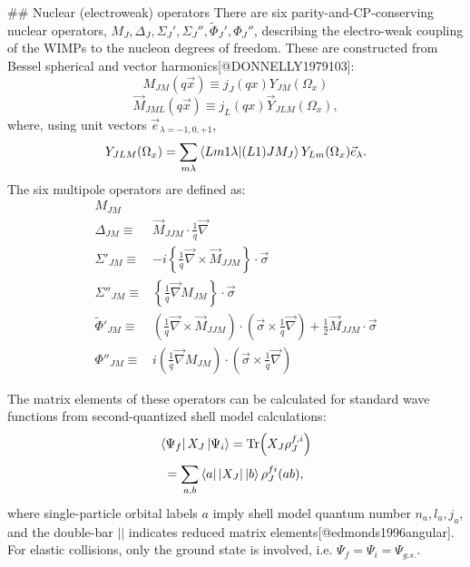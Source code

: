 ## Nuclear (electroweak) operators
There are six parity-and-CP-conserving nuclear operators, $M_J, \Delta_J,
\Sigma_J', \Sigma_J'', \tilde{\Phi}_J', \Phi_J''$, describing the electro-weak
coupling of the WIMPs to the nucleon degrees of freedom.  These are constructed
from Bessel spherical and vector harmonics[@DONNELLY1979103]:
\begin{equation}
    M_{JM}(q\vec{x})\equiv j_J(qx)Y_{JM}(\Omega_x)
\end{equation}
\begin{equation}
    \vec{M}_{JML}(q\vec{x}) \equiv j_L(qx) \vec{Y}_{JLM}(\Omega_x),
\end{equation}
where, using unit vectors $\vec{e}_{\lambda = -1, 0, +1}$,
\begin{equation}
    Y_{JLM}(\Omega_x) = \sum_{m\lambda} \bra{Lm1\lambda}\ket{(L1)JM_J} Y_{Lm}(\Omega_x)\vec{e}_\lambda.
\end{equation}
The six multipole operators are defined as:
\begin{equation}
\begin{split}
M_{JM}\ \ &\\
\Delta_{JM} \equiv& \vec{M}_{JJM}\cdot \frac{1}{q}\vec{\nabla}\\
\Sigma'_{JM} \equiv& -i \left \{\frac{1}{q}\vec{\nabla}\times \vec{M}_{JJM}  \right\}\cdot \vec{\sigma}\\
\Sigma''_{JM} \equiv& \left \{ \frac{1}{q}\vec{\nabla}M_{JM} \right \}\cdot \vec{\sigma}\\
\tilde{\Phi}'_{JM} \equiv& \left( \frac{1}{q} \vec{\nabla} \times \vec{M}_{JJM}\right)\cdot \left(\vec{\sigma}\times \frac{1}{q}\vec{\nabla} \right) + \frac{1}{2}\vec{M}_{JJM}\cdot \vec{\sigma}\\
\Phi''_{JM}\equiv& i\left(\frac{1}{q}\vec{\nabla}M_{JM} \right)\cdot \left(\vec{\sigma}\times \frac{1}{q}\vec{\nabla} \right)
\end{split}
\end{equation}

The matrix elements of these operators can be calculated for standard wave
functions from second-quantized shell model calculations:
\begin{equation}
    \bra{\Psi_f} X_J \ket{\Psi_i} = \Tr(X_J \rho^{f,i}_J )
\end{equation}
\begin{equation}
 = \sum_{a,b} \bra{a} |X_J| \ket{b} \rho^{fi}_J(ab),
\end{equation}
where single-particle orbital labels $a$ imply shell model quantum number $n_a,
l_a, j_a$, and the double-bar $||$ indicates reduced matrix
elements[@edmonds1996angular]. For elastic collisions, only the ground
state is involved, i.e. $\Psi_f=\Psi_i=\Psi_{g.s.}$.

